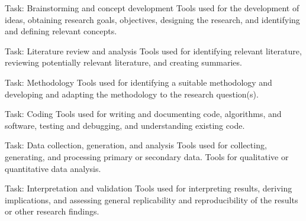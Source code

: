 \documentclass[11pt]{article}
\begin{document}
\vspace{.25em}

\begin{answerbox}{Task: Brainstorming and concept development}
  Tools used for the development of ideas, obtaining research goals,
  objectives, designing the research, and identifying and defining
  relevant concepts.
\end{answerbox}

\vspace{.25em}

\begin{answerbox}{Task: Literature review and analysis}
  Tools used for identifying relevant literature, reviewing
  potentially relevant literature,  and creating summaries.
\end{answerbox}

\vspace{.25em}

\begin{answerbox}{Task: Methodology}
  Tools used for identifying a suitable methodology and developing
  and adapting the methodology to the research question(s).
\end{answerbox}

\vspace{.25em}

\begin{answerbox}{Task: Coding}
  Tools used for writing and documenting code, algorithms, and
  software, testing and debugging, and understanding existing code.
\end{answerbox}

\vspace{.25em}

\begin{answerbox}{Task: Data collection, generation, and analysis}
  Tools used for collecting, generating, and processing primary or
  secondary data. Tools for qualitative or quantitative data analysis.
\end{answerbox}

\vspace{.25em}

\begin{answerbox}{Task: Interpretation and validation}
  Tools used for interpreting results, deriving implications, and
  assessing general replicability and reproducibility of the results
  or other research findings.
\end{answerbox}

\vspace{.25em}
\end{document}
